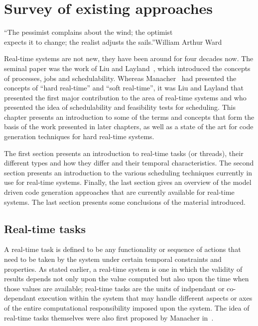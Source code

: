 \chapter{Survey of existing approaches}{``The pessimist complains
  about the wind; the optimist\\expects it to change; the realist
  adjusts the sails.''}{William Arthur Ward}
\label{chap:biblio}

Real-time systems are not new, they have been around for four decades
now. The seminal paper was the work of Liu and
Layland~\cite{liu@jacm73}, which introduced the concepts of processes,
jobs and schedulability. Whereas Manacher~\cite{manacher@jacm67} had
presented the concepts of ``hard real-time'' and ``soft real-time'',
it was Liu and Layland that presented the first major contribution to
the area of real-time systems and who presented the idea of
schedulability and feasibility tests for scheduling. This chapter
presents an introduction to some of the terms and concepts that form
the basis of the work presented in later chapters, as well as a state
of the art for code generation techniques for hard real-time systems.

The first section presents an introduction to real-time tasks (or
threads), their different types and how they differ and their temporal
characteristics. The second section presents an introduction to the
various scheduling techniques currently in use for real-time
systems. Finally, the last section gives an overview of the model
driven code generation approaches that are currently available for
real-time systems. The last section presents some conclusions of the
material introduced.

\section{Real-time tasks}
A real-time task is defined to be any functionality or sequence of
actions that need to be taken by the system under certain temporal
constraints and properties. As stated earlier, a real-time system is
one in which the validity of results depends not only upon the value
computed but also upon the time when those values are available;
real-time tasks are the units of indpendant or co-dependant execution
within the system that may handle different aspects or axes of the
entire computational responsibility imposed upon the system. The idea
of real-time tasks themselves were also first proposed by Manacher
in~\cite{manacher@jacm67}.

